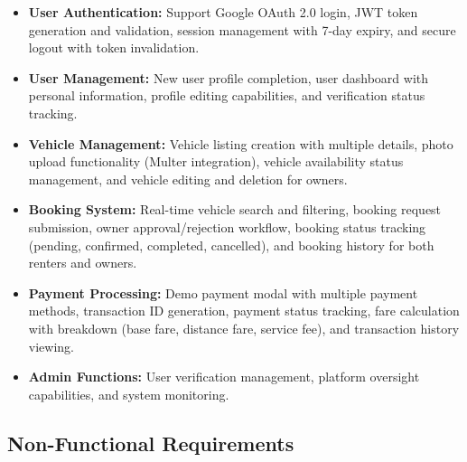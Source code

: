 \documentclass[12pt,a4paper]{report}
\begin{document}
	\begin{itemize}
		\item \textbf{User Authentication:} Support Google OAuth 2.0 login, JWT token generation and validation, session management with 7-day expiry, and secure logout with token invalidation.
		
		\item \textbf{User Management:} New user profile completion, user dashboard with personal information, profile editing capabilities, and verification status tracking.
		
		\item \textbf{Vehicle Management:} Vehicle listing creation with multiple details, photo upload functionality (Multer integration), vehicle availability status management, and vehicle editing and deletion for owners.
		
		\item \textbf{Booking System:} Real-time vehicle search and filtering, booking request submission, owner approval/rejection workflow, booking status tracking (pending, confirmed, completed, cancelled), and booking history for both renters and owners.
		
		\item \textbf{Payment Processing:} Demo payment modal with multiple payment methods, transaction ID generation, payment status tracking, fare calculation with breakdown (base fare, distance fare, service fee), and transaction history viewing.
		
		\item \textbf{Admin Functions:} User verification management, platform oversight capabilities, and system monitoring.
	\end{itemize}
	
	\subsection{Non-Functional Requirements}
	
\end{document}
